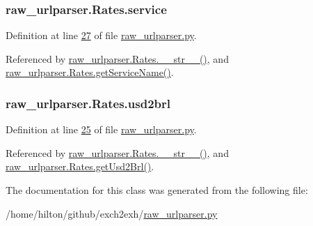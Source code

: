 \subsubsection[{\texorpdfstring{service}{service}}]{\setlength{\rightskip}{0pt plus 5cm}raw\+\_\+urlparser.\+Rates.\+service}\hypertarget{classraw__urlparser_1_1_rates_acb05316e95a39bc42590a882712f854b}{}\label{classraw__urlparser_1_1_rates_acb05316e95a39bc42590a882712f854b}


Definition at line \hyperlink{raw__urlparser_8py_source_l00027}{27} of file \hyperlink{raw__urlparser_8py_source}{raw\+\_\+urlparser.\+py}.



Referenced by \hyperlink{raw__urlparser_8py_source_l00038}{raw\+\_\+urlparser.\+Rates.\+\_\+\+\_\+str\+\_\+\+\_\+()}, and \hyperlink{raw__urlparser_8py_source_l00035}{raw\+\_\+urlparser.\+Rates.\+get\+Service\+Name()}.

\subsubsection[{\texorpdfstring{usd2brl}{usd2brl}}]{\setlength{\rightskip}{0pt plus 5cm}raw\+\_\+urlparser.\+Rates.\+usd2brl}\hypertarget{classraw__urlparser_1_1_rates_a52d9b688be8385a87783b27839749b4a}{}\label{classraw__urlparser_1_1_rates_a52d9b688be8385a87783b27839749b4a}


Definition at line \hyperlink{raw__urlparser_8py_source_l00025}{25} of file \hyperlink{raw__urlparser_8py_source}{raw\+\_\+urlparser.\+py}.



Referenced by \hyperlink{raw__urlparser_8py_source_l00038}{raw\+\_\+urlparser.\+Rates.\+\_\+\+\_\+str\+\_\+\+\_\+()}, and \hyperlink{raw__urlparser_8py_source_l00032}{raw\+\_\+urlparser.\+Rates.\+get\+Usd2\+Brl()}.



The documentation for this class was generated from the following file\+:\begin{DoxyCompactItemize}
\item 
/home/hilton/github/exch2exh/\hyperlink{raw__urlparser_8py}{raw\+\_\+urlparser.\+py}\end{DoxyCompactItemize}
